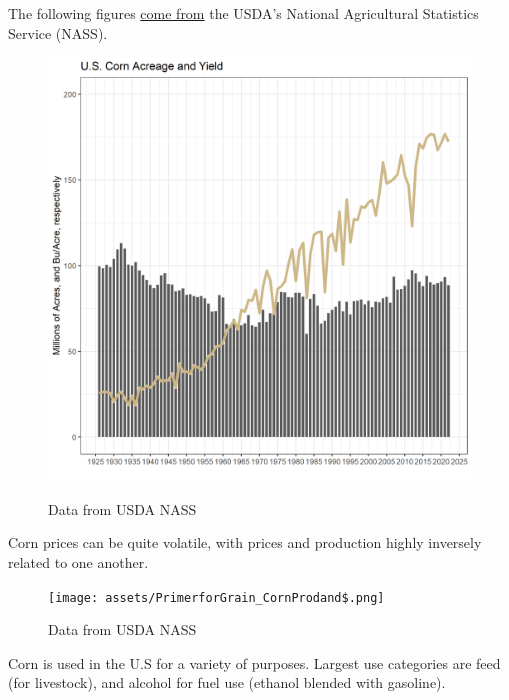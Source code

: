 \documentclass[
  letterpaper,
  DIV=11,
  numbers=noendperiod]{scrreprt}
\begin{document}
The following figures
\href{http://www.ers.usda.gov/topics/crops/corn/background.aspx}{come
from} the USDA's National Agricultural Statistics Service (NASS).

\begin{figure}

{\centering 

\href{https://quickstats.nass.usda.gov/}{\includegraphics{assets/PrimerforGrain_CornAcandY.png}}

}

\caption{Data from USDA NASS}

\end{figure}

Corn prices can be quite volatile, with prices and production highly
inversely related to one another.

\begin{figure}

{\centering \texttt{[image: assets/PrimerforGrain\_CornProdand\$.png]}

}

\caption{Data from USDA NASS}

\end{figure}

Corn is used in the U.S for a variety of purposes. Largest use
categories are feed (for livestock), and alcohol for fuel use (ethanol
blended with gasoline).
\end{document}
